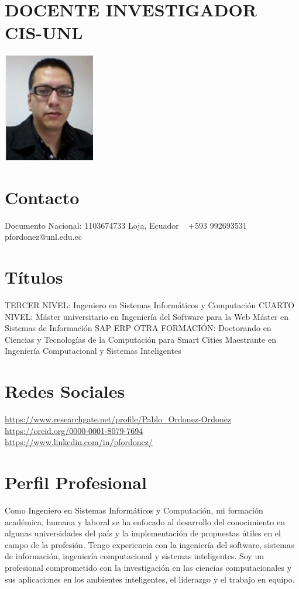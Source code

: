 \documentclass[]{cv-style} %
\begin{document}
\begin{aside}
\section{DOCENTE INVESTIGADOR {CIS-UNL}} %
\includegraphics[width=4cm]{foto}
\section{Contacto}
Documento Nacional: 1103674733
Loja, Ecuador
~
+593 992693531
~
pfordonez@unl.edu.ec
~
\section{Títulos}
TERCER NIVEL:
Ingeniero en Sistemas Informáticos y Computación
CUARTO NIVEL:
Máster universitario en Ingeniería del Software para la Web
Máster en Sistemas de Información SAP ERP
OTRA FORMACIÓN:
Doctorando en Ciencias y Tecnologías de la Computación para Smart Cities
Maestrante en Ingeniería Computacional y Sistemas Inteligentes 
~
\section{Redes Sociales}
\small
\url{https://www.researchgate.net/profile/Pablo_Ordonez-Ordonez}
~
\url{https://orcid.org/0000-0001-8079-7694}
~
\url{https://www.linkedin.com/in/pfordonez/}
~
\end{aside}
\small
\section{Perfil Profesional}
  \vspace{-0.3cm}
\small
Como Ingeniero en Sistemas Informáticos y Computación, mi formación académica, humana y laboral se ha enfocado al desarrollo del conocimiento en algunas universidades del país y la implementación de propuestas útiles en el campo de la profesión. Tengo experiencia con la ingeniería del software, sistemas de información, ingeniería computacional y sistemas inteligentes. Soy un profesional comprometido con la investigación en las ciencias computacionales y sus aplicaciones en los ambientes inteligentes, el liderazgo y el trabajo en equipo.
\end{document}
